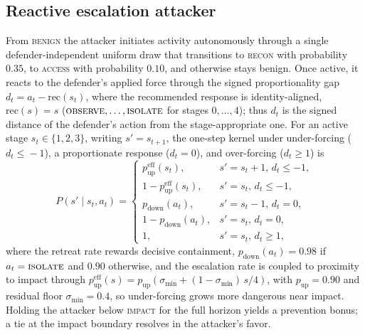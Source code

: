 \documentclass[3p,twocolumn]{elsarticle}
\begin{document}
\subsection{Reactive escalation attacker}
\label{sec:attacker}
From \textsc{benign} the attacker initiates activity autonomously through a
single defender-independent uniform draw that transitions to \textsc{recon}
with probability $0.35$, to \textsc{access} with probability $0.10$, and
otherwise stays benign. Once active, it
reacts to the defender's applied force through the signed proportionality gap
$d_t = a_t - \mathrm{rec}(s_t)$, where the recommended response is
identity-aligned, $\mathrm{rec}(s)=s$ ($\textsc{observe},\dots,\textsc{isolate}$
for stages $0,\dots,4$); thus $d_t$ is the signed distance of the defender's
action from the stage-appropriate one.
For an active stage $s_t\in\{1,2,3\}$, writing $s'=s_{t+1}$, the one-step kernel
under under-forcing ($d_t\!\le\!-1$), a proportionate response ($d_t\!=\!0$),
and over-forcing ($d_t\!\ge\!1$) is
\begin{equation}
P(s'\mid s_t,a_t) =
\begin{cases}
p_{\text{up}}^{\text{eff}}(s_t), & s'{=}s_t{+}1,\, d_t{\le}{-}1,\\
1-p_{\text{up}}^{\text{eff}}(s_t), & s'{=}s_t,\, d_t{\le}{-}1,\\
p_{\text{down}}(a_t), & s'{=}s_t{-}1,\, d_t{=}0,\\
1-p_{\text{down}}(a_t), & s'{=}s_t,\, d_t{=}0,\\
1, & s'{=}s_t,\, d_t{\ge}1,
\end{cases}
\label{eq:transition}
\end{equation}
where the retreat rate rewards decisive containment,
$p_{\text{down}}(a_t)=0.98$ if $a_t=\textsc{isolate}$ and $0.90$ otherwise, and
the escalation rate is coupled to proximity to impact through
$p_{\text{up}}^{\text{eff}}(s) = p_{\text{up}}(\sigma_{\min} + (1-\sigma_{\min})\,s/4)$,
with $p_{\text{up}}=0.90$ and residual floor $\sigma_{\min}=0.4$, so under-forcing
grows more dangerous near impact. Holding the attacker below \textsc{impact}
for the full horizon yields a prevention bonus; a tie at the impact boundary
resolves in the attacker's favor.
\end{document}
